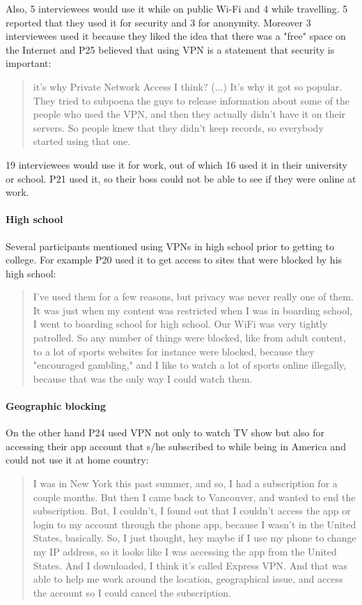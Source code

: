 Also, 5 interviewees would use it while on public Wi-Fi and 4 while
travelling. 5 reported that they used it for security and 3 for anonymity.
Moreover 3 interviewees used it because they liked the idea that there was a
"free" space on the Internet and P25 believed that using VPN is a statement
that security is important:

\begin{quote}it's why Private Network Access I think? (...) It's why it got so
popular. They tried to subpoena the guys to release information about some of
the people who used the VPN, and then they actually didn't have it on their
servers. So people knew that they didn't keep records, so everybody started
using that one. \end{quote}


19 interviewees would use it for work, out of which 16 used it in their
university or school. P21 used it, so their boss could not be able to see if
they were online at work.

\paragraph{High school} Several participants mentioned using VPNs in high school prior to getting to college. For example P20 used it to get access to sites that were
blocked by his high school: 
\begin{quote}I've used them for a few reasons,
    but privacy was never really one of them. It was just when my content was
    restricted when I was in boarding school, I went to boarding
    school for high school. Our WiFi was very tightly patrolled. So any number
    of things were blocked, like from adult content, to a lot of sports
    websites for instance were blocked, because they "encouraged gambling,"
    and I like to watch a lot of sports online illegally, because that was the
    only way I could watch them.\end{quote}

\paragraph{Geographic blocking} On the other hand P24 used VPN not only to watch
TV show but also for accessing their app account that s/he subscribed to while
being in America and could not use it at home country: \begin{quote}I was in
New York this past summer, and so, I had a subscription for a couple months.
But then I came back to Vancouver, and wanted to end the subscription. But, I
couldn't, I found out that I couldn't access the app or login to my account
through the phone app, because I wasn't in the United States, basically. So, I
just thought, hey maybe if I use my phone to change my IP address, so it
looks like I was accessing the app from the United States. And I downloaded, I
think it's called Express VPN. And that was able to help me work around the
location, geographical issue, and access the account so I could cancel the
subscription.\end{quote}


